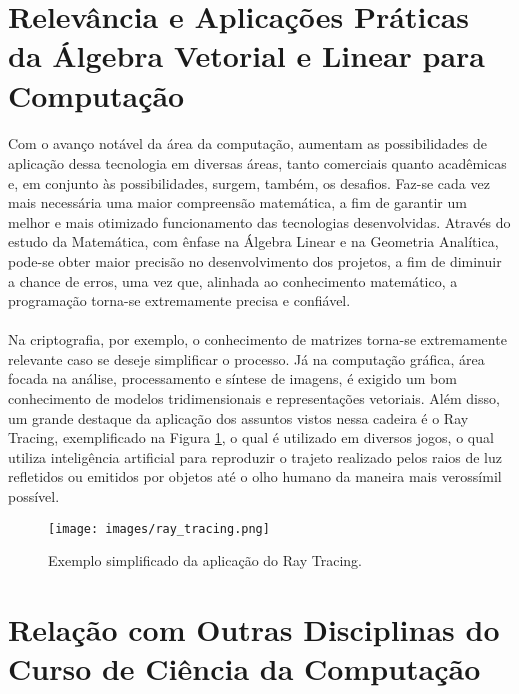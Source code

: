\documentclass[14pt, a4paper]{article}
\begin{document}
\section{Relevância e Aplicações Práticas da Álgebra Vetorial e Linear para Computação}

\paragraph{}

Com o avanço notável da área da computação, aumentam as possibilidades de aplicação dessa tecnologia em diversas áreas, tanto comerciais quanto acadêmicas e, em conjunto às possibilidades, surgem, também, os desafios. Faz-se cada vez mais necessária uma maior compreensão matemática, a fim de garantir um melhor e mais otimizado funcionamento das tecnologias  desenvolvidas. Através do estudo da Matemática, com ênfase na Álgebra Linear e na Geometria Analítica, pode-se obter maior precisão no desenvolvimento dos projetos, a fim de diminuir a chance de erros, uma vez que, alinhada ao conhecimento matemático, a programação torna-se extremamente precisa e confiável. 

\paragraph{}

Na criptografia, por exemplo, o conhecimento de matrizes torna-se extremamente relevante caso se deseje simplificar o processo. Já na computação gráfica,  área focada na análise, processamento e síntese de imagens, é exigido um bom conhecimento de modelos tridimensionais e representações vetoriais. Além disso, um grande destaque da aplicação dos assuntos vistos nessa cadeira é o Ray Tracing, exemplificado na Figura \ref{figura:raytracing}, o qual é utilizado em diversos jogos, o qual utiliza inteligência artificial para reproduzir o trajeto realizado pelos raios de luz refletidos ou emitidos por objetos até o olho humano da maneira mais verossímil possível.

\begin{figure}[ht]
\centering
\texttt{[image: images/ray\_tracing.png]}
\caption{Exemplo simplificado da aplicação do Ray Tracing.}
\label{figura:raytracing}
\end{figure}


\section{Relação com Outras Disciplinas do Curso de Ciência da Computação}
\end{document}
